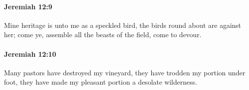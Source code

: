 		\paragraph{Jeremiah 12:9} %
			\label{JEREMIAH-12-9}

			Mine heritage is unto me as a speckled bird, the birds round about are against her; come ye, assemble all the beasts of the field, come to devour.


		\paragraph{Jeremiah 12:10} %
			\label{JEREMIAH-12-10}

			Many pastors have destroyed my vineyard, they have trodden my portion under foot, they have made my pleasant portion a desolate wilderness.


